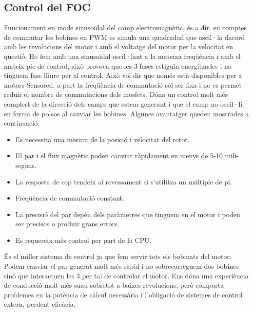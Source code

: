 \subsection{Control del FOC}
Funcionament en mode sinusoïdal del camp electromagnètic, és a dir, en comptes de commutar les bobines en PWM es simula una quadradad que oscil·la dacord amb les revolucions del motor i amb el voltatge del motor per la velocitat en qüestió. Ho fem amb una sinusoïdal oscil·lant a la mateixa freqüència i amb el mateix pic de control, això provoca que les 3 fases estiguin energitzades i no tinguem fase lliure per al control. Això vol dir que només està disponibles per a motors Sensored, a part la freqüència de commutació sòl ser fixa i no es permet reduir el nombre de commutacions dels mosfets. Dóna un control molt més complert de la direcció dels camps que estem generant i que el camp no oscil·li en forma de polsos al canviar les bobines. Algunes avantatges queden mostrades a continuació:
\begin{itemize}
    \item Es necessita una mesura de la posició i velocitat del rotor.
    \item El par i el flux magnètic poden canviar ràpidament en menys de 5-10 mili-segons. 
    \item La resposta de cop tendeix al revessament si s'utilitza un múltiple de pi. 
    \item Freqüència de commutació constant.
    \item La precisió del par depèn dels paràmetres que tinguem en el motor i poden ser precisos o produir grans errors.
    \item Es requereix més control per part de la CPU.
\end{itemize}

És el millor sistema de control ja que fem servir tots els bobinats del motor. Podem canviar el par generat molt més ràpid i no sobrecarreguem dos bobines sinó que interactuen les 3 per tal de controlar el motor. Ens dóna una experiència de conducció molt més suau sobretot a baixes revolucions, però comporta problemes en la potència de càlcul necessària i l'obligació de sistemes de control extern, perdent eficàcia.

